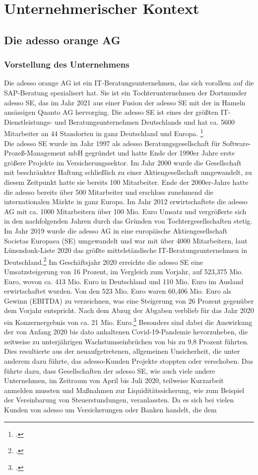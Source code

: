 \section{Unternehmerischer Kontext}
\subsection{Die adesso orange AG}
\subsubsection{Vorstellung des Unternehmens}
Die adesso orange AG ist ein IT-Beratungsunternehmen, das sich vorallem auf die SAP-Beratung spezialisert hat. Sie ist ein Tochterunternehmen der Dortmunder adesso SE, das im Jahr 2021 aus einer Fusion der adesso SE mit der in Hameln ansässigen Quanto AG hervorging. Die adesso SE ist eines der größten IT-Dienstleistungs- und Beratungsunternehmen Deutschlands und hat ca. 5600 Mitarbeiter an 44 Standorten in ganz Deutschland und Europa. \footcite[Vgl.][]{adesso-main} \\Die adesso SE wurde im Jahr 1997 als \glqq{}adesso Beratungsgesellschaft für Software-Prozeß-Management mbH\grqq{} gegründet und hatte Ende der 1990er Jahre erste größere Projekte im Versicherungssektor. Im Jahr 2000 wurde die Gesellschaft mit beschränkter Haftung schließlich zu einer Aktiengesellschaft umgewandelt, zu diesem Zeitpunkt hatte sie bereits 100 Mitarbeiter. Ende der 2000er-Jahre hatte die adesso bereits über 500 Mitarbeiter und erschloss zunehmend die internationalen Märkte in ganz Europa. Im Jahr 2012 erwirtschaftete die adesso AG mit ca. 1000 Mitarbeitern über 100 Mio. Euro Umsatz und vergrößerte sich in den nachfolgenden Jahren durch das Gründen von Tochtergesellschaften stetig. Im Jahr 2019 wurde die adesso AG in eine europäische Aktiengesellschaft \glqq{}Societas Europaea\grqq{} (SE) umgewandelt und war mit über 4000 Mitarbeitern, laut \glqq{}Lünendonk-Liste 2020\grqq{} das größte mittelständische IT-Beratungsunternehmen in Deutschland.\footcite[Vgl.][]{adesso-historie} Im Geschäftsjahr 2020 erreichte die adesso SE eine Umsatzsteigerung von 16 Prozent, im Vergleich zum Vorjahr, auf 523,375 Mio. Euro, wovon ca. 413 Mio. Euro in Deutschland und 110 Mio. Euro im Ausland erwirtschaftet wurden. Von den 523 Mio. Euro waren 60,406 Mio. Euro als Gewinn (EBITDA) zu verzeichnen, was eine Steigerung von 26 Prozent gegenüber dem Vorjahr entspricht. Nach dem Abzug der Abgaben verblieb für das Jahr 2020 ein Konzernergebnis von ca. 21 Mio. Euro.\footcite[Vgl.][S. 4]{adesso2020-report} Besonders sind dabei die Auswirkung der von Anfang 2020 bis dato anhaltenen Covid-19-Pandemie hevorzuheben, die zeitweise zu unterjährigen Wachstumseinbrüchen von bis zu 9,8 Prozent führten. Dies resultierte aus der neuaufgetretenen, allgemeinen Unsicherheit, die unter anderem dazu führte, das adesso-Kunden Projekte stoppten oder verschoben. Das führte dazu, dass Gesellschaften der adesso SE, wie auch viele andere Unternehmen, im Zeitraum von April bis Juli 2020, teilweise Kurzarbeit anmelden mussten und Maßnahmen zur Liquiditätssicherung, wie zum Beispiel der Vereinbarung von Steuerstundungen, veranlassten. Da es sich bei vielen Kunden von adesso um Versicherungen oder Banken handelt, die dem 